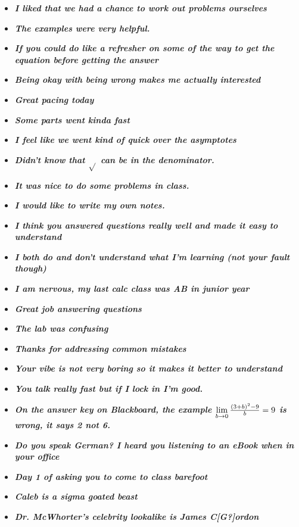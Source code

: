 \documentclass[11pt,letterpaper]{article}
\begin{document}
\begin{itemize}
\item {\bfseries\itshape I liked that we had a chance to work out problems ourselves}
\item {\bfseries\itshape The examples were very helpful.}
\item {\bfseries\itshape If you could do like a refresher on some of the way to get the equation before getting the answer} 
\item {\bfseries\itshape Being okay with being wrong makes me actually interested}
\item {\bfseries\itshape Great pacing today} 
\item {\bfseries\itshape Some parts went kinda fast}
\item {\bfseries\itshape I feel like we went kind of quick over the asymptotes} 
\item {\bfseries\itshape Didn't know that $\sqrt{}$ can be in the denominator.}
\item {\bfseries\itshape It was nice to do some problems in class.}
\item {\bfseries\itshape I would like to write my own notes.} 
\item {\bfseries\itshape I think you answered questions really well and made it easy to understand} 
\item {\bfseries\itshape I both do and don't understand what I'm learning (not your fault though)} 
\item {\bfseries\itshape I am nervous, my last calc class was AB in junior year} 
\item {\bfseries\itshape Great job answering questions} 
\item {\bfseries\itshape The lab was confusing} 
\item {\bfseries\itshape Thanks for addressing common mistakes} 
\item {\bfseries\itshape Your vibe is not very boring so it makes it better to understand}
\item {\bfseries\itshape You talk really fast but if I lock in I'm good.} 
\item {\bfseries\itshape On the answer key on Blackboard, the example $\displaystyle\lim_{b \to 0} \tfrac{(3 + b)^2 - 9}{b}= 9$ is wrong, it says 2 not 6.} 

\item {\bfseries\itshape Do you speak German? I heard you listening to an eBook when in your office} 
\item {\bfseries\itshape Day 1 of asking you to come to class barefoot}
\item {\bfseries\itshape Caleb is a sigma goated beast} 
\item {\bfseries\itshape Dr. McWhorter's celebrity lookalike is James C[G?]ordon} 
\end{itemize}
\end{document}
